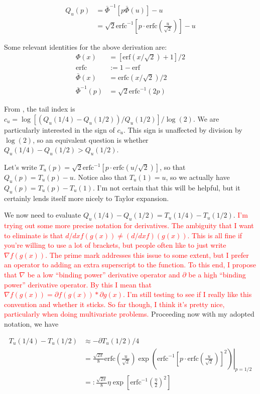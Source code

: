 \documentclass{article}
\begin{document}
\begin{align}
    Q_u(p) &= \bar{\Phi}^{-1}[p \bar{\Phi}(u)] - u\\
    &= \sqrt{2} \mathrm{erfc}^{-1} \left[ p \cdot \mathrm{erfc}\left( \frac{u}{\sqrt{2}} \right) \right] - u
\end{align}

Some relevant identities for the above derivation are:
\begin{align}
    \Phi(x) &= [\mathrm{erf}(x/\sqrt{2}) + 1] /2\\
    \mathrm{erfc} &:= 1 - \mathrm{erf}\\
    \bar{\Phi}(x) &= \mathrm{erfc}(x / \sqrt{2}) / 2 \\
    \bar{\Phi}^{-1}(p) &= \sqrt{2} \mathrm{erfc}^{-1}(2 p)
\end{align}


From \citeauthor{Pic75}, the tail index is $c_u = \log[(Q_u(1/4) - Q_u(1/2)) / Q_u(1/2)] / \log(2)$. We are particularly interested in the sign of $c_u$. This sign is unaffected by division by $\log(2)$, so an equivalent question is whether $Q_u(1/4) - Q_u(1/2) > Q_u(1/2)$.

Let's write $T_u(p) = \sqrt{2} \mathrm{erfc}^{-1} \left[ p \cdot \mathrm{erfc}\left(u / \sqrt{2} \right) \right]$, so that $Q_u(p) = T_u(p) - u$. Notice also that $T_u(1) = u$, so we actually have $Q_u(p) = T_u(p) - T_u(1)$. I'm not certain that this will be helpful, but it certainly lends itself more nicely to Taylor expansion.

We now need to evaluate $Q_u(1/4) - Q_u(1/2) = T_u(1/4) - T_u(1/2)$. \textcolor{red}{I'm trying out some more precise notation for derivatives. The ambiguity that I want to eliminate is that $d/dx f(g(x)) \neq (d/dx f)(g(x))$. This is all fine if you're willing to use a lot of brackets, but people often like to just write $\nabla f(g(x))$. The prime mark addresses this issue to some extent, but I prefer an operator to adding an extra superscript to the function. To this end, I propose that $\nabla$ be a low ``binding power'' derivative operator and $\partial$ be a high ``binding power'' derivative operator. By this I mean that $\nabla f(g(x)) = \partial f(g(x)) * \partial g(x)$. I'm still testing to see if I really like this convention and whether it sticks. So far though, I think it's pretty nice, particularly when doing multivariate problems.} Proceeding now with my adopted notation, we have

\begin{align}
    T_u(1/4) - T_u(1/2) & \approx - \partial T_u(1/2) / 4\\
    &= \left. \frac{\sqrt{2 \pi}}{8} \mathrm{erfc} \left( \frac{u}{\sqrt{2}} \right) \exp \left( \mathrm{erfc}^{-1} \left[ p \cdot \mathrm{erfc} \left( \frac{u}{\sqrt{2}} \right) \right]^2 \right) \right|_{p = 1/2}\\
    & =: \frac{\sqrt{2 \pi}}{8} \eta \exp \left[ \mathrm{erfc}^{-1} \left( \frac{\eta}{2} \right)^2 \right]
\end{align}
\end{document}
